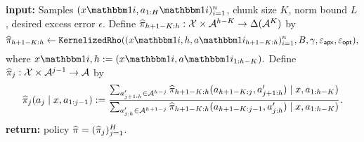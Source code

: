 \begin{algorithm}[tp]
\caption{$\ChunkKR((x\ind{i},a\ind{i}_{1:H})_{i=1}^n, K,L, \epsilon)$}\label{alg:chunkkr}
\begin{algorithmic}[1]
\State \textbf{input:} Samples $(x\ind{i},a_{1:H}\ind{i})_{i=1}^n$, chunk size $K$, norm bound $L$, desired excess error $\epsilon$.
\State {}
    \State Define $\widehat{\pi}_{h+1-K:h}: \mathcal{X} \times \mathcal{A}^{h-K} \to \Delta(\mathcal{A}^K)$ by
    \[\pihat_{h+1-K:h} \gets \KernRho((x\ind{i,h},a\ind{i}_{h+1-K:h})_{i=1}^n, B, \gamma, \epapx,\epopt),\]
    where $x\ind{i,h} := (x\ind{i}, a\ind{i}_{1:h-K}).$
        \State Define $\widehat{\pi}_j: \mathcal{X}\times\mathcal{A}^{j-1} \to \mathcal{A}$ by
        \[\widehat{\pi}_j(a_j\mid{}x,a_{1:j-1}) := \frac{\sum_{a'_{j+1:h} \in \mathcal{A}^{h-j}} \widehat{\pi}_{h+1-K:h}(a_{h+1-K:j},a'_{j+1:h})\mid{}x,a_{1:h-K})}{\sum_{a'_{j:h} \in \mathcal{A}^{h+1-j}} \widehat{\pi}_{h+1-K:h}(a_{h+1-K:j-1},a'_{j:h})\mid{}x,a_{1:h-K})}.\]
    \EndFor
\EndFor
\State \textbf{return:} policy $\widehat{\pi} = (\widehat{\pi}_j)_{j=1}^H$.
\end{algorithmic}
\end{algorithm}
